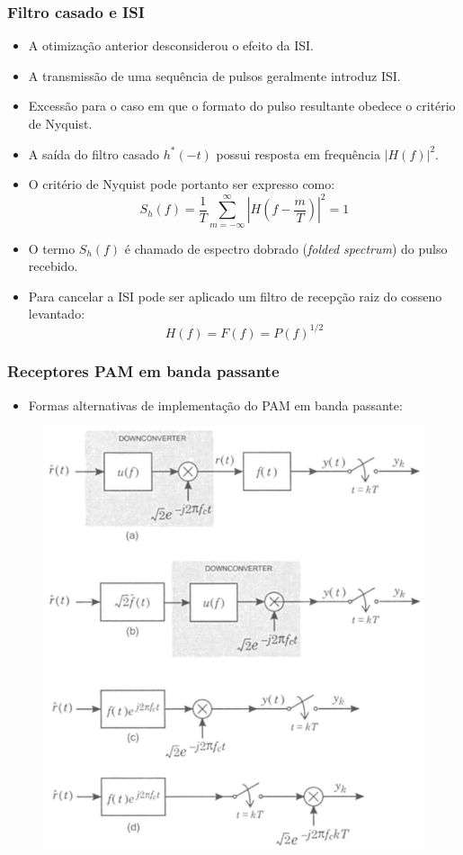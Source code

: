 \begin{frame}
	\frametitle{Filtro casado e ISI}

	\begin{itemize}
	    \item A otimização anterior desconsiderou o efeito da ISI.
	    \item A transmissão de uma sequência de pulsos geralmente introduz ISI.
	    \item Excessão para o caso em que o formato do pulso resultante obedece o critério de Nyquist.
	    \item A saída do filtro casado $h^*(-t)$ possui resposta em frequência $|H(f)|^2$.
	    \item O critério de Nyquist pode portanto ser expresso como:
	    \begin{equation*}
		    S_h(f) = \frac{1}{T} \sum_{m=-\infty}^{\infty} \left| H\left(f - \frac{m}{T} \right) \right|^2 = 1
	    \end{equation*}
	    \item O termo $S_h(f)$ é chamado de espectro dobrado (\textit{folded spectrum}) do pulso recebido.
	    \item Para cancelar a ISI pode ser aplicado um filtro de recepção raiz do cosseno levantado:
	    \begin{equation*}
		    H(f) = F(f) = P(f)^{1/2}
	    \end{equation*}

	\end{itemize}
\end{frame}

\begin{frame}
	\frametitle{Receptores PAM em banda passante}

	\begin{itemize}
	    \item Formas alternativas de implementação do PAM em banda passante:
	\end{itemize}
	\begin{figure}[t]	
	    \begin{center}
	    \includegraphics[width=0.5\columnwidth]{figs/pam_29}
	    \end{center} 
	\end{figure}
\end{frame}

